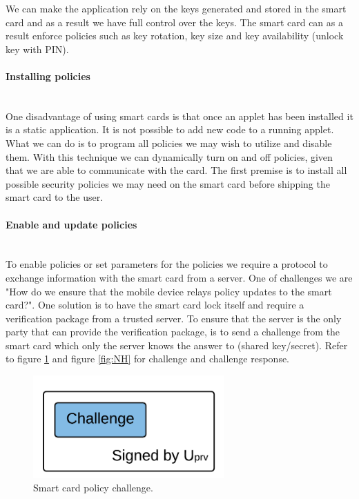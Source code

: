 We can make the application rely on the keys generated and stored in the smart card and as a result we have full control over the keys. The smart card can as a result enforce policies such as key rotation, key size and key availability (unlock key with PIN).

\paragraph{Installing policies}\mbox{}\\
One disadvantage of using smart cards is that once an applet has been installed it is a static application. It is not possible to add new code to a running applet. What we can do is to program all policies we may wish to utilize and disable them. With this technique we can dynamically turn on and off policies, given that we are able to communicate with the card. The first premise is to install all possible security policies we may need on the smart card before shipping the smart card to the user.

\paragraph{Enable and update policies}\mbox{}\\
To enable policies or set parameters for the policies we require a protocol to exchange information with the smart card from a server. One of challenges we are "How do we ensure that the mobile device relays policy updates to the smart card?". One solution is to have the smart card lock itself and require a verification package from a trusted server. To ensure that the server is the only party that can provide the verification package, is to send a challenge from the smart card which only the server knows the answer to (shared key/secret). Refer to figure \ref{fig:OH} and figure \ref{fig:NH} for challenge and challenge response.

\begin{figure}[h!]
  \caption{Smart card policy challenge.}
  \label{fig:OH}
  \centering
    \includegraphics[width=0.65\textwidth]{images/challenge.png}
\end{figure}

